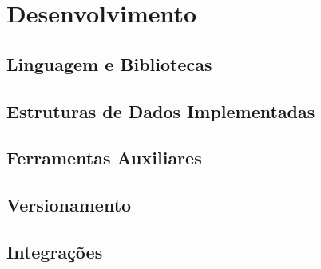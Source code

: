 \documentclass[../main.tex]{subfiles}
\begin{document}
\section{Desenvolvimento}
\subsection{Linguagem e Bibliotecas}
\subsection{Estruturas de Dados Implementadas}
\subsection{Ferramentas Auxiliares}
\subsection{Versionamento}
\subsection{Integrações}
\end{document}
